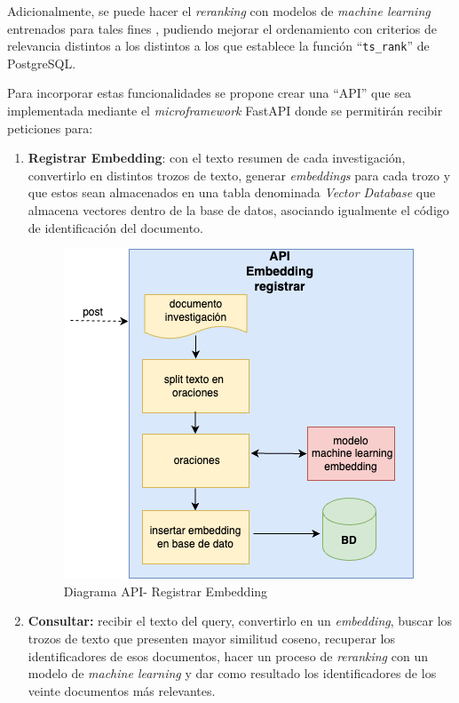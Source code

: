 \documentclass[
  12pt,
  openany]{book}
\begin{document}
Adicionalmente, se puede hacer el \emph{reranking} con modelos de \emph{machine learning} entrenados para tales fines \citep{gökçe2020}, \citep{nogueira2019} pudiendo mejorar el ordenamiento con criterios de relevancia distintos a los distintos a los que establece la función ``\texttt{ts\_rank}'' de PostgreSQL.

Para incorporar estas funcionalidades se propone crear una ``API'' que sea implementada mediante el \emph{microframework} FastAPI donde se permitirán recibir peticiones para:

\begin{enumerate}
\def\labelenumi{\arabic{enumi}.}
\item
  \textbf{Registrar Embedding}: con el texto resumen de cada investigación, convertirlo en distintos trozos de texto, generar \emph{embeddings} para cada trozo y que estos sean almacenados en una tabla denominada \emph{Vector Database} que almacena vectores dentro de la base de datos, asociando igualmente el código de identificación del documento.

  \begin{figure}

  {\centering \includegraphics[width=0.45\linewidth]{images/05-desarrollo/5_ciclo/diagramapiregistrar1} 

  }

  \caption{Diagrama API- Registrar Embedding}\label{fig:semanticoregistrar}
  \end{figure}
\item
  \textbf{Consultar:} recibir el texto del query, convertirlo en un \emph{embedding}, buscar los trozos de texto que presenten mayor similitud coseno, recuperar los identificadores de esos documentos, hacer un proceso de \emph{reranking} con un modelo de \emph{machine learning} y dar como resultado los identificadores de los veinte documentos más relevantes.

  \begin{figure}


\end{figure}
\end{enumerate}
\end{document}
